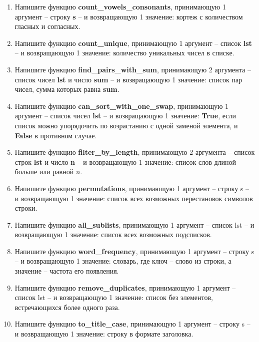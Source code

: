 \documentclass[a4,12pt]{article}
\theoremstyle{remark}
\begin{document}
\begin{enumerate}
    \item Напишите функцию \textbf{count\_vowels\_consonants}, принимающую 1 аргумент – строку \textbf{s} – и возвращающую 1 значение: кортеж с количеством гласных и согласных.
    \item Напишите функцию \textbf{count\_unique}, принимающую 1 аргумент – список \textbf{lst} – и возвращающую 1 значение: количество уникальных чисел в списке.
    \item Напишите функцию \textbf{find\_pairs\_with\_sum}, принимающую 2 аргумента – список чисел \textbf{lst} и число \textbf{sum} – и возвращающую 1 значение: список пар чисел, сумма которых равна \textbf{sum}.
    \item Напишите функцию \textbf{can\_sort\_with\_one\_swap}, принимающую 1 аргумент – список чисел \textbf{lst} – и возвращающую 1 значение: \textbf{True}, если список можно упорядочить по возрастанию с одной заменой элемента, и \textbf{False} в противном случае.
    \item Напишите функцию \textbf{filter\_by\_length}, принимающую 2 аргумента – список строк \textbf{lst} и число \textbf{n} – и возвращающую 1 значение: список слов длиной больше или равной $n$.
    \item Напишите функцию \textbf{permutations}, принимающую 1 аргумент – строку s – и возвращающую 1 значение: список всех возможных перестановок символов строки.
    \item Напишите функцию \textbf{all\_sublists}, принимающую 1 аргумент – список lst – и возвращающую 1 значение: список всех возможных подсписков.
    \item Напишите функцию \textbf{word\_frequency}, принимающую 1 аргумент – строку s – и возвращающую 1 значение: словарь, где ключ – слово из строки, а значение – частота его появления.
    \item Напишите функцию \textbf{remove\_duplicates}, принимающую 1 аргумент – список lst – и возвращающую 1 значение: список без элементов, встречающихся более одного раза.
    \item Напишите функцию \textbf{to\_title\_case}, принимающую 1 аргумент – строку s – и возвращающую 1 значение: строку в формате заголовка.

\end{enumerate}
\end{document}
